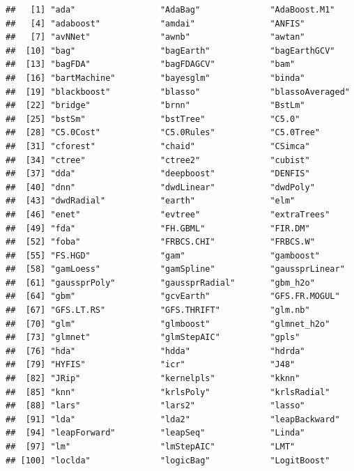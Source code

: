 \documentclass[]{book}
\theoremstyle{break}
\theoremstyle{definition}
\theoremstyle{definition}
\theoremstyle{definition}
\theoremstyle{remark}
\begin{document}
\begin{verbatim}
##   [1] "ada"                 "AdaBag"              "AdaBoost.M1"        
##   [4] "adaboost"            "amdai"               "ANFIS"              
##   [7] "avNNet"              "awnb"                "awtan"              
##  [10] "bag"                 "bagEarth"            "bagEarthGCV"        
##  [13] "bagFDA"              "bagFDAGCV"           "bam"                
##  [16] "bartMachine"         "bayesglm"            "binda"              
##  [19] "blackboost"          "blasso"              "blassoAveraged"     
##  [22] "bridge"              "brnn"                "BstLm"              
##  [25] "bstSm"               "bstTree"             "C5.0"               
##  [28] "C5.0Cost"            "C5.0Rules"           "C5.0Tree"           
##  [31] "cforest"             "chaid"               "CSimca"             
##  [34] "ctree"               "ctree2"              "cubist"             
##  [37] "dda"                 "deepboost"           "DENFIS"             
##  [40] "dnn"                 "dwdLinear"           "dwdPoly"            
##  [43] "dwdRadial"           "earth"               "elm"                
##  [46] "enet"                "evtree"              "extraTrees"         
##  [49] "fda"                 "FH.GBML"             "FIR.DM"             
##  [52] "foba"                "FRBCS.CHI"           "FRBCS.W"            
##  [55] "FS.HGD"              "gam"                 "gamboost"           
##  [58] "gamLoess"            "gamSpline"           "gaussprLinear"      
##  [61] "gaussprPoly"         "gaussprRadial"       "gbm_h2o"            
##  [64] "gbm"                 "gcvEarth"            "GFS.FR.MOGUL"       
##  [67] "GFS.LT.RS"           "GFS.THRIFT"          "glm.nb"             
##  [70] "glm"                 "glmboost"            "glmnet_h2o"         
##  [73] "glmnet"              "glmStepAIC"          "gpls"               
##  [76] "hda"                 "hdda"                "hdrda"              
##  [79] "HYFIS"               "icr"                 "J48"                
##  [82] "JRip"                "kernelpls"           "kknn"               
##  [85] "knn"                 "krlsPoly"            "krlsRadial"         
##  [88] "lars"                "lars2"               "lasso"              
##  [91] "lda"                 "lda2"                "leapBackward"       
##  [94] "leapForward"         "leapSeq"             "Linda"              
##  [97] "lm"                  "lmStepAIC"           "LMT"                
## [100] "loclda"              "logicBag"            "LogitBoost"         

\end{verbatim}
\end{document}
